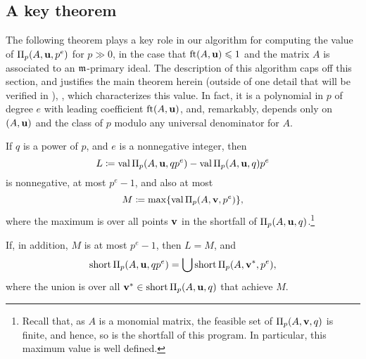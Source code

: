 \documentclass[11pt]{amsart}
\newcommand{\short}{\operatorname{short}}
\begin{document}
\subsection{A key theorem}
The following theorem plays a key role in our algorithm for computing the value of $\Pi_p(A, \mathbf{u}, p^e)$ for $p \gg 0$, in the case that $\operatorname{ft}(A, \mathbf{u}) \leqslant 1$ and the matrix $A$ is associated to an $\mathfrak{m}$-primary ideal.  
The description of this algorithm caps off this section, and justifies the main theorem herein (outside of one detail that will be verified in ), , which characterizes this value.
In fact, it is a polynomial in $p$ of degree $e$ with leading coefficient $\operatorname{ft}(A, \mathbf{u})$, and, remarkably, depends only on $(A,\mathbf{u})$ and the class of $p$ modulo any universal denominator for $A$. 

\begin{theorem}  
\label{general AIP: T}
If $q$ is a power of $p$, and $e$ is a nonnegative integer, then
%
\[  L \coloneqq \operatorname{val} \Pi_p(A, \mathbf{u}, qp^e) -  \operatorname{val} \Pi_p(A, \mathbf{u}, q)p^e  \]
is nonnegative, at most $p^e-1$, and also at most
%
\[ M \coloneqq \max \{ \operatorname{val} \Pi_p(A, \mathbf{v}, p^e)  \},  \] 
where the maximum is over all points $\mathbf{v}$ in the shortfall of $\Pi_p(A, \mathbf{u}, q)$.\footnote{
   Recall that, as $A$ is a monomial matrix, the feasible set of $\Pi_p(A, \mathbf{v}, q)$ is finite, and hence, so is the shortfall of this program.  In particular, this maximum value is well defined.
}

If, in addition, $M$ is at most $p^e-1$,  then $L=M$, and 
\[  \short \IP_p(A, \vv{u}, qp^e) = \bigcup \short \IP_p(A, \vv{v}^{\ast}, p^e), \]
where the union is over all $\vv{v}^{\ast} \in \short \IP_p(A, \vv{u}, q)$ that achieve $M$.
\end{theorem}
\end{document}
